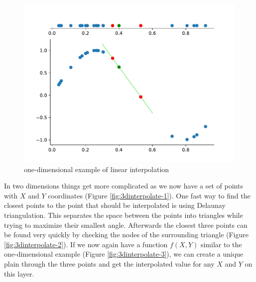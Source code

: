 \begin{figure}[h] %
	\centering
	\includegraphics[width=0.8\linewidth]{images/vis1d.pdf}
	\caption{one-dimensional example of linear interpolation}
	\label{fig:one-dim-interpolation}
\end{figure}

In two dimensions things get more complicated as we now have a set of points with $X$ and $Y$ coordinates (Figure \ref{fig:3dinterpolate-1}). One fast way to find the closest points to the point that should be interpolated is using Delaunay triangulation. This separates the space between the points into triangles while trying to maximize their smallest angle. Afterwards the closest three points can be found very quickly by checking the nodes of the surrounding triangle  (Figure \ref{fig:3dinterpolate-2}). If we now again have a function $f(X,Y)$ similar to the one-dimensional example (Figure \ref{fig:3dinterpolate-3}), we can create a unique plain through the three points and get the interpolated value for any $X$ and $Y$ on this layer.


